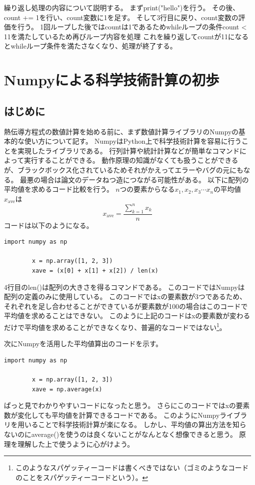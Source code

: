 \documentclass[]{ltjsbook}
\begin{document}
	繰り返し処理の内容について説明する。
	まずprint("hello")を行う。
	その後、count += 1を行い、count変数に1を足す。
	そして3行目に戻り、count変数の評価を行う。
	1回ループした後ではcountは1であるためwhileループの条件count < 11を満たしているため再びループ内容を処理
	これを繰り返してcountが11になるとwhileループ条件を満たさなくなり、処理が終了する。

	



	




	\chapter{Numpyによる科学技術計算の初歩}
	\section{はじめに}
	熱伝導方程式の数値計算を始める前に、まず数値計算ライブラリのNumpyの基本的な使い方について記す。
	NumpyはPython上で科学技術計算を容易に行うことを実現したライブラリである。
	行列計算や統計計算などが簡単なコマンドによって実行することができる。
	動作原理の知識がなくても扱うことができるが、ブラックボックス化されているためそれがかえってエラーやバグの元にもなる。
	最悪の場合は論文のデータねつ造につながる可能性がある。
	以下に配列の平均値を求めるコード比較を行う。
	$n$つの要素からなる$x_1, x_2, x_3 \cdots x_n$の平均値$x_\mathrm{ave}$は
	\begin{equation}
	x_\mathrm{ave} = \frac{\displaystyle{\sum_{k=1}^{n}x_k}}{n}
	\end{equation}
	コードは以下のようになる。
	\begin{lstlisting}[caption=average.py, label=average]
		import numpy as np

		x = np.array([1, 2, 3])
		xave = (x[0] + x[1] + x[2]) / len(x) 
	\end{lstlisting}
	4行目のlen()は配列の大きさを得るコマンドである。
	このコードではNumpyは配列の定義のみに使用している。
	このコードではxの要素数が3つであるため、それぞれを足し合わせることができているが要素数が100の場合はこのコードで平均値を求めることはできない。
	このように上記のコードはxの要素数が変わるだけで平均値を求めることができなくなり、普遍的なコードではない\footnote{このようなスパゲッティーコードは書くべきではない（ゴミのようなコードのことをスパゲッティーコードという）。}。

	次にNumpyを活用した平均値算出のコードを示す。
	\begin{lstlisting}[caption=averagenumpy.py, label=avenumpy]
		import numpy as np

		x = np.array([1, 2, 3])
		xave = np.average(x)
	\end{lstlisting}
	ぱっと見でわかりやすいコードになったと思う。
	さらにこのコードではxの要素数が変化しても平均値を計算できるコードである。
	このようにNumpyライブラリを用いることで科学技術計算が楽になる。
	しかし、平均値の算出方法を知らないのにaverage()を使うのは良くないことがなんとなく想像できると思う。
	原理を理解した上で使うように心がけよう。
\end{document}
